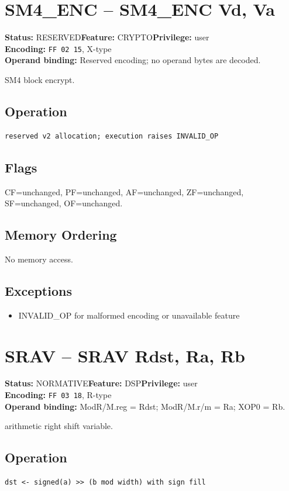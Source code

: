 \documentclass[10pt]{article}
\begin{document}
\section{SM4\_ENC -- SM4\_ENC Vd, Va}
\textbf{Status:} RESERVED\quad \textbf{Feature:} CRYPTO\quad \textbf{Privilege:} user\\
\textbf{Encoding:} \texttt{FF 02 15}, X-type\\
\textbf{Operand binding:} Reserved encoding; no operand bytes are decoded.

SM4 block encrypt.

\subsection*{Operation}
\begin{lstlisting}
reserved v2 allocation; execution raises INVALID_OP
\end{lstlisting}
\subsection*{Flags}
CF=unchanged, PF=unchanged, AF=unchanged, ZF=unchanged, SF=unchanged, OF=unchanged.
\subsection*{Memory Ordering}
No memory access.
\subsection*{Exceptions}
\begin{itemize}
\item INVALID\_OP for malformed encoding or unavailable feature
\end{itemize}
\clearpage

\section{SRAV -- SRAV Rdst, Ra, Rb}
\textbf{Status:} NORMATIVE\quad \textbf{Feature:} DSP\quad \textbf{Privilege:} user\\
\textbf{Encoding:} \texttt{FF 03 18}, R-type\\
\textbf{Operand binding:} ModR/M.reg = Rdst; ModR/M.r/m = Ra; XOP0 = Rb.

arithmetic right shift variable.

\subsection*{Operation}
\begin{lstlisting}
dst <- signed(a) >> (b mod width) with sign fill
\end{lstlisting}
\end{document}
